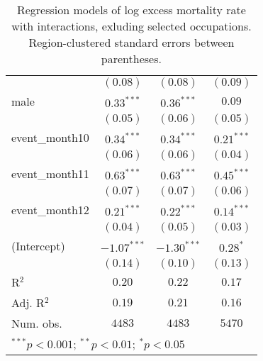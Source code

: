 \begin{table}
\begin{center}
\begin{tabular}{l c c c}
                                 & $(0.08)$      & $(0.08)$      & $(0.09)$      \\
male                             & $0.33^{***}$  & $0.36^{***}$  & $0.09$        \\
                                 & $(0.05)$      & $(0.06)$      & $(0.05)$      \\
event\_month10                   & $0.34^{***}$  & $0.34^{***}$  & $0.21^{***}$  \\
                                 & $(0.06)$      & $(0.06)$      & $(0.04)$      \\
event\_month11                   & $0.63^{***}$  & $0.63^{***}$  & $0.45^{***}$  \\
                                 & $(0.07)$      & $(0.07)$      & $(0.06)$      \\
event\_month12                   & $0.21^{***}$  & $0.22^{***}$  & $0.14^{***}$  \\
                                 & $(0.04)$      & $(0.05)$      & $(0.03)$      \\
(Intercept)                      & $-1.07^{***}$ & $-1.30^{***}$ & $0.28^{*}$    \\
                                 & $(0.14)$      & $(0.10)$      & $(0.13)$      \\
\hline
R$^2$                            & $0.20$        & $0.22$        & $0.17$        \\
Adj. R$^2$                       & $0.19$        & $0.21$        & $0.16$        \\
Num. obs.                        & $4483$        & $4483$        & $5470$        \\
\hline
\multicolumn{4}{l}{\scriptsize{$^{***}p<0.001$; $^{**}p<0.01$; $^{*}p<0.05$}}
\end{tabular}
\caption{Regression models of log excess mortality rate with interactions, exluding selected occupations. Region-clustered standard errors between parentheses.}
\label{tab:intermodels}
\end{center}
\end{table}
